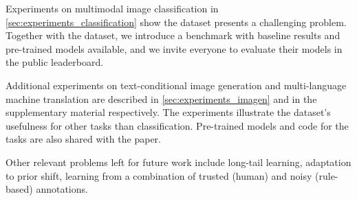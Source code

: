 \documentclass{bmvc2k}
\begin{document}
Experiments on multimodal image classification in \autoref{sec:experiments_classification} show the dataset presents a challenging problem. Together with the dataset, we introduce a benchmark with baseline results and pre-trained models available, and we invite everyone to evaluate their models in the public leaderboard. 

Additional experiments on text-conditional image generation and multi-language machine translation are described in \autoref{sec:experiments_imagen}  and in the supplementary material respectively. The experiments illustrate the dataset's usefulness for other tasks than classification. Pre-trained models and code for the tasks are also shared with the paper.


Other relevant problems left for future work include long-tail learning, adaptation to prior shift, learning from a combination of trusted (human) and noisy (rule-based) annotations.
\end{document}
